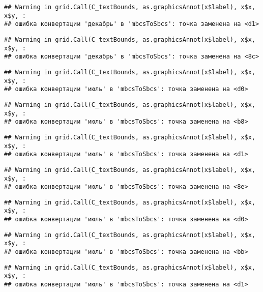 \documentclass[
]{article}
\begin{document}
\begin{verbatim}
## Warning in grid.Call(C_textBounds, as.graphicsAnnot(x$label), x$x, x$y, :
## ошибка конвертации 'декабрь' в 'mbcsToSbcs': точка заменена на <d1>
\end{verbatim}

\begin{verbatim}
## Warning in grid.Call(C_textBounds, as.graphicsAnnot(x$label), x$x, x$y, :
## ошибка конвертации 'декабрь' в 'mbcsToSbcs': точка заменена на <8c>
\end{verbatim}

\begin{verbatim}
## Warning in grid.Call(C_textBounds, as.graphicsAnnot(x$label), x$x, x$y, :
## ошибка конвертации 'июль' в 'mbcsToSbcs': точка заменена на <d0>
\end{verbatim}

\begin{verbatim}
## Warning in grid.Call(C_textBounds, as.graphicsAnnot(x$label), x$x, x$y, :
## ошибка конвертации 'июль' в 'mbcsToSbcs': точка заменена на <b8>
\end{verbatim}

\begin{verbatim}
## Warning in grid.Call(C_textBounds, as.graphicsAnnot(x$label), x$x, x$y, :
## ошибка конвертации 'июль' в 'mbcsToSbcs': точка заменена на <d1>
\end{verbatim}

\begin{verbatim}
## Warning in grid.Call(C_textBounds, as.graphicsAnnot(x$label), x$x, x$y, :
## ошибка конвертации 'июль' в 'mbcsToSbcs': точка заменена на <8e>
\end{verbatim}

\begin{verbatim}
## Warning in grid.Call(C_textBounds, as.graphicsAnnot(x$label), x$x, x$y, :
## ошибка конвертации 'июль' в 'mbcsToSbcs': точка заменена на <d0>
\end{verbatim}

\begin{verbatim}
## Warning in grid.Call(C_textBounds, as.graphicsAnnot(x$label), x$x, x$y, :
## ошибка конвертации 'июль' в 'mbcsToSbcs': точка заменена на <bb>
\end{verbatim}

\begin{verbatim}
## Warning in grid.Call(C_textBounds, as.graphicsAnnot(x$label), x$x, x$y, :
## ошибка конвертации 'июль' в 'mbcsToSbcs': точка заменена на <d1>
\end{verbatim}
\end{document}
